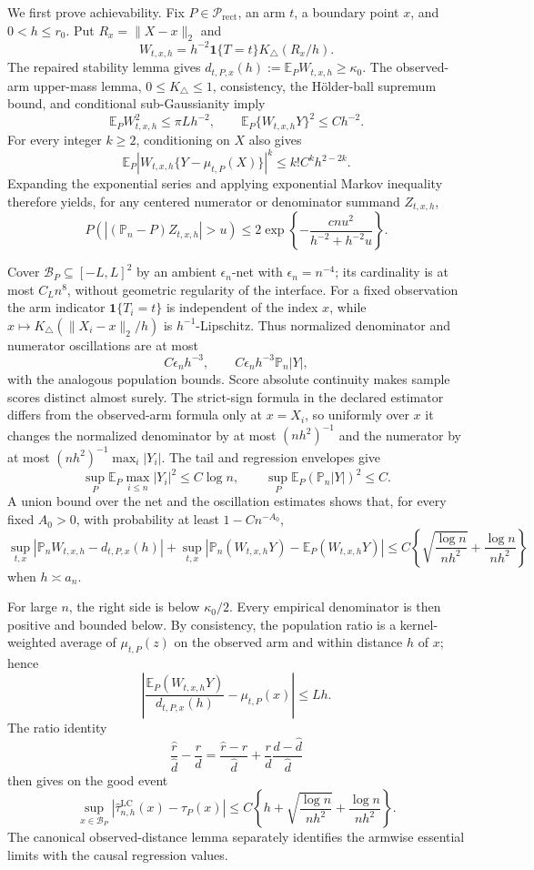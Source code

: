 We first prove achievability.  Fix \(P\in\mathcal P_{\mathrm{rect}}\), an arm
\(t\), a boundary point \(x\), and \(0<h\leq r_0\).  Put
\(R_x=\lVert X-x\rVert_2\) and
\[
 W_{t,x,h}=h^{-2}\mathbf1\{T=t\}K_\triangle(R_x/h).
\]
The repaired stability lemma gives
\(d_{t,P,x}(h):=\mathbb E_PW_{t,x,h}\geq\kappa_0\).  The observed-arm
upper-mass lemma, \(0\leq K_\triangle\leq1\), consistency, the H\"older-ball
supremum bound, and conditional sub-Gaussianity imply
\[
 \mathbb E_PW_{t,x,h}^2\leq\pi Lh^{-2},
 \qquad
 \mathbb E_P\{W_{t,x,h}Y\}^2\leq Ch^{-2}.
\]
For every integer \(k\geq2\), conditioning on \(X\) also gives
\[
 \mathbb E_P|W_{t,x,h}\{Y-\mu_{t,P}(X)\}|^k
 \leq k!C^kh^{2-2k}.
\]
Expanding the exponential series and applying exponential Markov inequality
therefore yields, for any centered numerator or denominator summand
\(Z_{t,x,h}\),
\[
 P\!\left(\left|(\mathbb P_n-P)Z_{t,x,h}\right|>u\right)
 \leq2\exp\!\left\{-\frac{cnu^2}{h^{-2}+h^{-2}u}\right\}.
\]

Cover \(\mathcal B_P\subseteq[-L,L]^2\) by an ambient
\(\epsilon_n\)-net with \(\epsilon_n=n^{-4}\); its cardinality is at most
\(C_Ln^8\), without geometric regularity of the interface.  For a fixed
observation the arm indicator \(\mathbf1\{T_i=t\}\) is independent of the
index \(x\), while
\(x\mapsto K_\triangle(\lVert X_i-x\rVert_2/h)\) is
\(h^{-1}\)-Lipschitz.  Thus normalized denominator and numerator oscillations
are at most
\[
 C\epsilon_nh^{-3},
 \qquad C\epsilon_nh^{-3}\mathbb P_n|Y|,
\]
with the analogous population bounds.  Score absolute continuity makes sample
scores distinct almost surely.  The strict-sign formula in the declared
estimator differs from the observed-arm formula only at \(x=X_i\), so uniformly
over \(x\) it changes the normalized denominator by at most
\((nh^2)^{-1}\) and the numerator by at most
\((nh^2)^{-1}\max_i|Y_i|\).  The tail and regression envelopes give
\[
 \sup_P\mathbb E_P\max_{i\leq n}|Y_i|^2\leq C\log n,
 \qquad
 \sup_P\mathbb E_P(\mathbb P_n|Y|)^2\leq C.
\]
A union bound over the net and the oscillation estimates shows that, for every
fixed \(A_0>0\), with probability at least \(1-Cn^{-A_0}\),
\[
 \sup_{t,x}|\mathbb P_nW_{t,x,h}-d_{t,P,x}(h)|
 +\sup_{t,x}|\mathbb P_n(W_{t,x,h}Y)-\mathbb E_P(W_{t,x,h}Y)|
 \leq C\left\{\sqrt{\frac{\log n}{nh^2}}+
 \frac{\log n}{nh^2}\right\}
\]
when \(h\asymp a_n\).

For large \(n\), the right side is below \(\kappa_0/2\).  Every empirical
denominator is then positive and bounded below.  By consistency, the population
ratio is a kernel-weighted average of \(\mu_{t,P}(z)\) on the observed arm and
within distance \(h\) of \(x\); hence
\[
 \left|\frac{\mathbb E_P(W_{t,x,h}Y)}{d_{t,P,x}(h)}
 -\mu_{t,P}(x)\right|\leq Lh.
\]
The ratio identity
\[
 \frac{\widehat r}{\widehat d}-\frac rd
 =\frac{\widehat r-r}{\widehat d}
 +\frac rd\frac{d-\widehat d}{\widehat d}
\]
then gives on the good event
\[
 \sup_{x\in\mathcal B_P}
 |\widehat\tau^{\mathrm{LC}}_{n,h}(x)-\tau_P(x)|
 \leq C\left\{h+\sqrt{\frac{\log n}{nh^2}}+
 \frac{\log n}{nh^2}\right\}.
\]
The canonical observed-distance lemma separately identifies the armwise
essential limits with the causal regression values.

